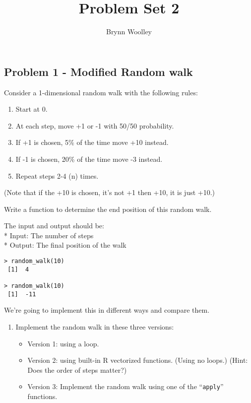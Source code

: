 \documentclass[
  letterpaper,
  DIV=11,
  numbers=noendperiod]{scrartcl}
\title{Problem Set 2}
\author{Brynn Woolley}
\date{}
\providecommand{\tightlist}{%
  \setlength{\itemsep}{0pt}\setlength{\parskip}{0pt}}
\begin{document}
\maketitle


\subsection{Problem 1 - Modified Random
walk}\label{problem-1---modified-random-walk}

Consider a 1-dimensional random walk with the following rules:

\begin{enumerate}
\def\labelenumi{\arabic{enumi}.}
\tightlist
\item
  Start at 0.\\
\item
  At each step, move +1 or -1 with 50/50 probability.\\
\item
  If +1 is chosen, 5\% of the time move +10 instead.\\
\item
  If -1 is chosen, 20\% of the time move -3 instead.\\
\item
  Repeat steps 2-4 (n) times.
\end{enumerate}

(Note that if the +10 is chosen, it's not +1 then +10, it is just +10.)

Write a function to determine the end position of this random walk.

The input and output should be:\\
* Input: The number of steps\\
* Output: The final position of the walk

\begin{verbatim}
> random_walk(10)  
 [1]  4  

> random_walk(10)  
 [1]  -11  
\end{verbatim}

We're going to implement this in different ways and compare them.

\begin{enumerate}
\def\labelenumi{\arabic{enumi}.}
\item
  Implement the random walk in these three versions:

  \begin{itemize}
  \item
    Version 1: using a loop.\\
  \item
    Version 2: using built-in R vectorized functions. (Using no loops.)
    (Hint: Does the order of steps matter?)\\
  \item
    Version 3: Implement the random walk using one of the
    ``\texttt{apply}'' functions.\\
  \end{itemize}
\end{enumerate}
\end{document}
